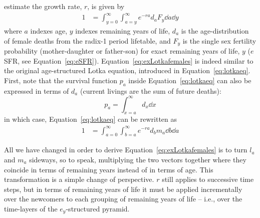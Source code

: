 estimate the growth rate, $r$, is given by
\begin{align}
\label{eq:exLotkafemales}
1 &= \int _{y=0}^\infty \int _{a=y}^\infty e^{-ra} d_{a} F_{y} \dd a \dd y
\end{align}
where $a$ indexes age, $y$ indexes remaining years of life,
$d_{a}$ is the age-distribution of female deaths from the radix-1 period
lifetable, and $F_{y}$ is the single sex fertility probability
(mother-daughter or father-son) for exact remaining years of
life, $y$ ($e$SFR, see Equation~\eqref{eq:eSFR}).
Equation~\eqref{eq:exLotkafemales} is indeed similar to the original
age-structured Lotka equation, introduced in Equation~\eqref{eq:lotkaeq}. First, note that the survival function $p_a$
inside Equation~\eqref{eq:lotkaeq} can also be expressed in terms of
$d_a$ (current livings are the sum of future deaths):
\begin{equation}
p_a = \int _{x = a} ^\infty d_x \dd x
\end{equation}
in which case, Equation~\ref{eq:lotkaeq} can be rewritten as
\begin{align}
\label{eq:lotkadx}
1 &= \int _{a=0}^\infty \int _{b = a}^\infty e^{-ra} d_b m_a \dd b \dd a
\end{align}

All we have changed in order to derive Equation~\eqref{eq:exLotkafemales}
is to turn $l_a$ and $m_a$ sideways, so to speak, multiplying the two vectors
together where they coincide in terms of remaining years instead of in terms of age. This
transformation is a simple change of perspective. $r$ still applies to
successive time steps, but in terms of remaining years of life it must be applied incrementally 
over the newcomers to
each grouping of remaining years of life -- i.e., over the time-layers of the
$e_y$-structured pyramid.
